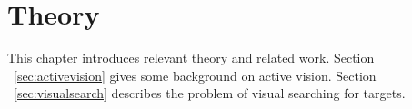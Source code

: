 \chapter{Theory}
\label{cha:theory}

% 
% 
% 
% 
% 
% 

This chapter introduces relevant theory and related work.
Section ~\ref{sec:activevision} gives some background on active vision.
Section ~\ref{sec:visualsearch} describes the problem of visual searching for targets.



